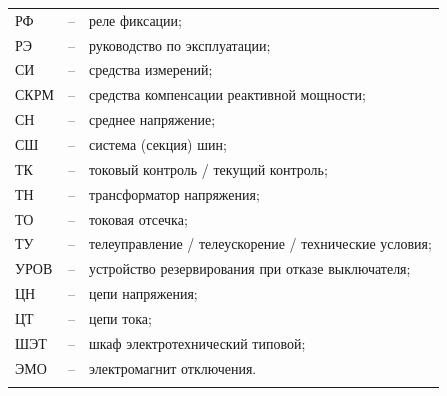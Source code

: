\begin{longtable}{>{\raggedright\arraybackslash}m{2cm}>{\raggedright\arraybackslash}m{0.5cm}>{\raggedright\arraybackslash}m{20cm}}
РФ & -- & реле фиксации; \\
РЭ & -- & руководство по эксплуатации; \\
СИ & -- & средства измерений; \\
СКРМ & -- & средства компенсации реактивной мощности; \\
СН & -- & среднее напряжение; \\
СШ & -- & система (секция) шин; \\
ТК & -- & токовый контроль / текущий контроль; \\
ТН & -- & трансформатор напряжения; \\
ТО & -- & токовая отсечка; \\
ТУ & -- & телеуправление / телеускорение / технические условия; \\
УРОВ & -- & устройство резервирования при отказе выключателя; \\
ЦН & -- & цепи напряжения; \\
ЦТ & -- & цепи тока; \\
ШЭТ & -- & шкаф электротехнический типовой; \\
ЭМО & -- & электромагнит отключения. \\
{\color{white}\fontsize{0.1pt}{0.1pt}\selectfont<endABBRS>}
\end{longtable}
